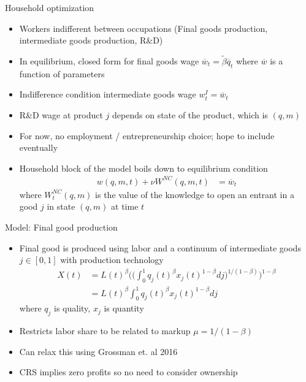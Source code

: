 \documentclass[english,usenames,dvipsnames]{beamer}
\begin{document}
\begin{frame}{Household optimization}
\small
\begin{itemize}
\item Workers indifferent between occupations (Final goods production, intermediate goods production, R\&D)
\item In equilibrium, closed form for final goods wage  $\overline{w}_t = \tilde{\beta} \overline{q}_t$ where $\overline{w}$ is a function of parameters
\item Indifference condition intermediate goods wage $w^I_t = \overline{w}_t$ 
\item R\&D wage at product $j$ depends on state of the product, which is $(q,m)$
\item For now, no employment / entrepreneurship choice; hope to include eventually
\item Household block of the model boils down to equilibrium condition
\begin{align*}
w(q,m,t) + \nu W^{NC}(q,m,t) &= \overline{w}_t
\end{align*}
where $W^{NC}_t(q,m)$ is the value of the knowledge to open an entrant in a good $j$ in state $(q,m)$ at time $t$ 
\end{itemize}
\end{frame}

\begin{frame}{Model: Final good production}
\begin{itemize}
	\item Final good is produced using labor and a continuum of intermediate goods $j\in[0,1]$ with production technology
	\begin{align*}
	X(t) &= L(t)^{\beta}\Bigg(\Big(\int_0^1 q_j(t)^\beta 
	x_j(t)^{1-\beta}dj \Big)^{1/(1-\beta)}\Bigg)^{1-\beta} \\
	&=  L(t)^{\beta}\int_0^1 q_j(t)^\beta x_j(t)^{1-\beta}dj
	\end{align*}
	where $q_j$ is quality, $x_j$ is quantity
	\item Restricts labor share to be related to markup $\mu = 1/(1-\beta)$
	\item Can relax this using Grossman et. al 2016
	\item CRS implies zero profits so no need to consider ownership
\end{itemize}
\end{frame}
\end{document}
